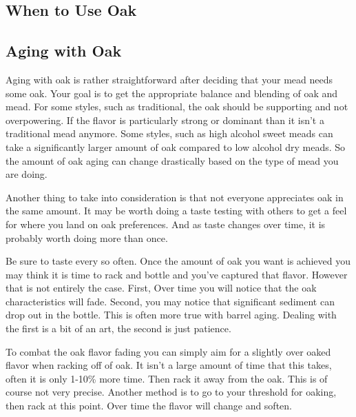  \subsection{When to Use Oak}


 \subsection{Aging with Oak}
  Aging with oak is rather straightforward after deciding that your mead needs some oak. Your goal is to get the
  appropriate balance and blending of oak and mead. For some styles, such as traditional, the oak should be supporting
  and not overpowering. If the flavor is particularly strong or dominant than it isn't a traditional mead anymore.
  Some styles, such as high alcohol sweet meads can take a significantly larger amount of oak compared to low alcohol
  dry meads. So the amount of oak aging can change drastically based on the type of mead you are doing. 

  Another thing to take into consideration is that not everyone appreciates oak in the same amount. It may be worth
  doing a taste testing with others to get a feel for where you land on oak preferences. And as taste changes
  over time, it is probably worth doing more than once.

  Be sure to taste every so often. Once the amount of oak you want is achieved you may think it is time to rack
  and bottle and you've captured that flavor. However that is not entirely the case. 
  First, Over time you will notice that the oak characteristics will fade. Second, you may notice that
  significant sediment can drop out in the bottle. This is often more true with barrel aging. Dealing with the first
  is a bit of an art, the second is just patience.

  To combat the oak flavor fading you can simply aim for a slightly over oaked flavor when racking off of oak. It
  isn't a large amount of time that this takes, often it is only 1-10\% more time. Then rack it away from the oak. 
  This is of course not very precise. Another method is to go to your threshold for oaking, then rack at this point.
  Over time the flavor will change and soften.

